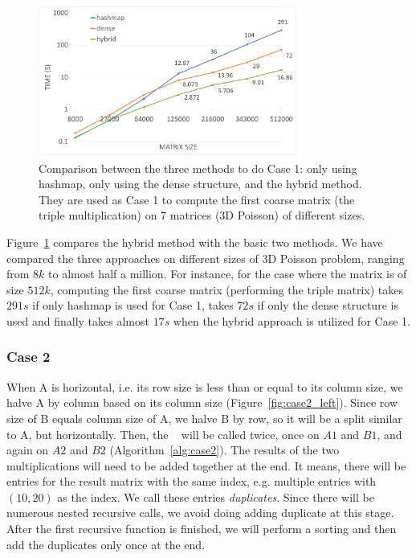 \begin{figure}[tbh]
 \centering
 \includegraphics[width=8.5cm,height=5cm]{./figures/mix.pdf}
 \caption{Comparison between the three methods to do Case 1: only using hashmap, only using the dense structure, and the hybrid method. They are used as Case 1 to compute the first coarse matrix (the triple multiplication) on 7 matrices (3D Poisson) of different sizes.}
 \label{fig:mix}
 \Description{}
\end{figure}

Figure~\ref{fig:mix} compares the hybrid method with the basic two methods. We have compared the three approaches on different sizes of 3D Poisson problem, ranging from $8k$ to almost half a million. For instance, for the case where the matrix is of size $512k$, computing the first coarse matrix (performing the triple matrix) takes $291s$ if only hashmap is used for Case 1, takes $72s$ if only the dense structure is used and finally takes almost $17s$ when the hybrid approach is utilized for Case 1.


\subsubsection{Case 2}
\label{sec:case2}
When A is horizontal, i.e. its row size is less than or equal to its column size, we halve A by column based on its column size (Figure~\ref{fig:case2_left}). Since row size of B equals column size of A, we halve B by row, so it will be a split similar to A, but horizontally.
Then, the \recmm~ will be called twice, once on $A1$ and $B1$, and again on $A2$ and $B2$ (Algorithm~\ref{alg:case2}). The results of the two multiplications will need to be added together at the end. It means, there will be entries for the result matrix with the same index, e.g. multiple entries with $(10, 20)$ as the index. We call these entries \textit{duplicates}. Since there will be numerous nested recursive calls, we avoid doing adding duplicate at this stage. After the first recursive function is finished, we will perform a sorting and then add the duplicates only once at the end.

